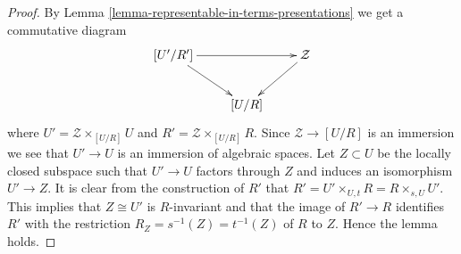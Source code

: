 \documentclass[10pt,a4paper]{amsart}
\theoremstyle{plain}
\theoremstyle{definition}
\theoremstyle{remark}
\numberwithin{equation}{subsection}
\begin{document}
\begin{proof}
By
Lemma \ref{lemma-representable-in-terms-presentations}
we get a commutative diagram
$$
\xymatrix{
[U'/R'] \ar[dr] \ar[rr] & & \mathcal{Z} \ar[ld] \\
& [U/R]
}
$$
where $U' = \mathcal{Z} \times_{[U/R]} U$ and
$R' = \mathcal{Z} \times_{[U/R]} R$.
Since $\mathcal{Z} \to [U/R]$ is an immersion we see that
$U' \to U$ is an immersion of algebraic spaces. Let $Z \subset U$
be the locally closed subspace such that $U' \to U$ factors through
$Z$ and induces an isomorphism $U' \to Z$.
It is clear from the construction of $R'$ that
$R' = U' \times_{U, t} R = R \times_{s, U} U'$.
This implies that $Z \cong U'$ is $R$-invariant and that the image of
$R' \to R$ identifies $R'$ with the restriction
$R_Z = s^{-1}(Z) = t^{-1}(Z)$ of $R$ to $Z$. Hence the lemma holds.
\end{proof}
\end{document}
